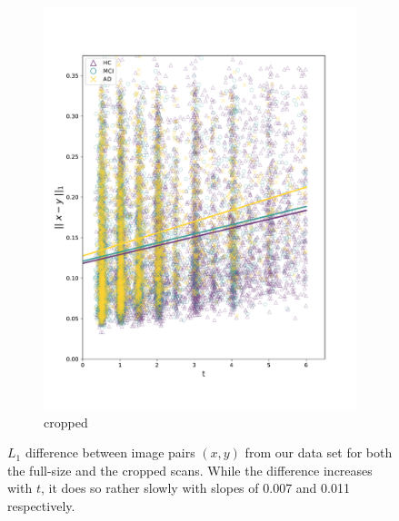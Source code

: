 \begin{figure}[h]
\begin{subfigure}{0.48\textwidth}
		\includegraphics[width=\linewidth, trim={10 30 30 30}, clip]{images/l1_diff_plots/slice.pdf}
		\caption{cropped}
	\end{subfigure}
	 
	\caption{$L_1$ difference between image pairs $(x, y)$ from our data set for both the full-size and the cropped scans. While the difference increases with $t$, it does so rather slowly with slopes of 0.007 and 0.011 respectively.}
	\label{fig:l1plots}
\end{figure}

